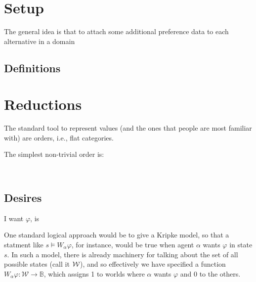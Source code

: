 \documentclass{article}
\begin{document}
	\section{Setup}
	
	
	The general idea is that to attach some additional preference data to each alternative in a domain
	
	\subsection{Definitions}
	

	
	\section{Reductions}
	
	The standard tool to represent values (and the ones that people are most familiar with) are orders, i.e., flat categories. 
	
	The simplest non-trivial order is:
	\begin{center}
		\raisebox{0.7em}{$\mathbb B = $}~
	\end{center}
	
	\subsection{Desires}
	
	I want $\varphi$, is 
	
	One standard logical approach would be to give a Kripke model, so that a statment like $s \vDash W_{\alpha} \varphi$, for instance, would be true when agent $\alpha$ wants $\varphi$ in state $s$. In such a model, there is already machinery for talking about the set of all possible states (call it $\cal W$), and so effectively we have specified a function $W_\alpha \varphi: \mathcal W \to \mathbb B$, which assigns 1 to worlds where $\alpha$ wants $\varphi$ and 0 to the others.
	
\end{document}
